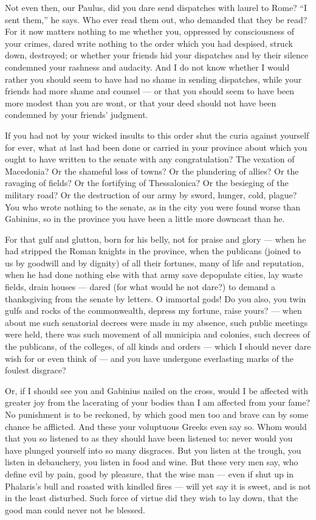  Not even then, our Paulus, did you dare send dispatches with laurel to Rome? ``I sent them,'' he says. Who ever read them out, who demanded that they be read? For it now matters nothing to me whether you, oppressed by consciousness of your crimes, dared write nothing to the order which you had despised, struck down, destroyed; or whether your friends hid your dispatches and by their silence condemned your rashness and audacity. And I do not know whether I would rather you should seem to have had no shame in sending dispatches, while your friends had more shame and counsel — or that you should seem to have been more modest than you are wont, or that your deed should not have been condemned by your friends' judgment.

 If you had not by your wicked insults to this order shut the curia against yourself for ever, what at last had been done or carried in your province about which you ought to have written to the senate with any congratulation? The vexation of Macedonia? Or the shameful loss of towns? Or the plundering of allies? Or the ravaging of fields? Or the fortifying of Thessalonica? Or the besieging of the military road? Or the destruction of our army by sword, hunger, cold, plague? You who wrote nothing to the senate, as in the city you were found worse than Gabinius, so in the province you have been a little more downcast than he.

 For that gulf and glutton, born for his belly, not for praise and glory — when he had stripped the Roman knights in the province, when the publicans (joined to us by goodwill and by dignity) of all their fortunes, many of life and reputation, when he had done nothing else with that army save depopulate cities, lay waste fields, drain houses — dared (for what would he not dare?) to demand a thanksgiving from the senate by letters. O immortal gods! Do you also, you twin gulfs and rocks of the commonwealth, depress my fortune, raise yours? — when about me such senatorial decrees were made in my absence, such public meetings were held, there was such movement of all municipia and colonies, such decrees of the publicans, of the colleges, of all kinds and orders — which I should never dare wish for or even think of — and you have undergone everlasting marks of the foulest disgrace?

 Or, if I should see you and Gabinius nailed on the cross, would I be affected with greater joy from the lacerating of your bodies than I am affected from your fame? No punishment is to be reckoned, by which good men too and brave can by some chance be afflicted. And these your voluptuous Greeks even say so. Whom would that you so listened to as they should have been listened to: never would you have plunged yourself into so many disgraces. But you listen at the trough, you listen in debauchery, you listen in food and wine. But these very men say, who define evil by pain, good by pleasure, that the wise man — even if shut up in Phalaris's bull and roasted with kindled fires — will yet say it is sweet, and is not in the least disturbed. Such force of virtue did they wish to lay down, that the good man could never not be blessed.

